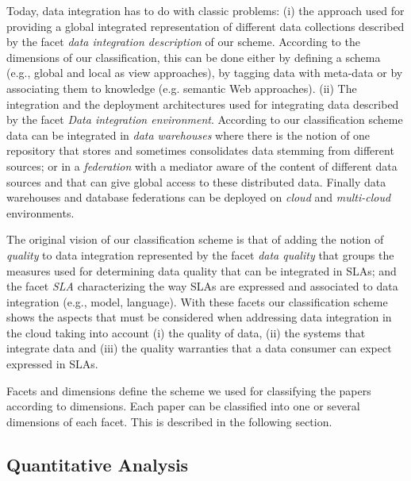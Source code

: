 Today, data integration has to do with  classic problems: (i) the approach used for providing a global integrated representation of different data collections described by the facet {\em data integration description} of our scheme. According to the dimensions of our classification, this can be done either by defining a schema (e.g., global and local as view approaches), by tagging data with meta-data or by associating them to knowledge (e.g. semantic Web approaches). (ii) The integration and the deployment architectures used for integrating data described by the facet {\em Data integration environment}. According to our classification scheme data can be integrated in {\em data warehouses} where there is the notion of one repository that stores and sometimes consolidates data stemming from different sources; or in a {\em federation} with a mediator aware of the content of different data sources and that can give global access to these distributed data. Finally data warehouses and database federations can be deployed on {\em cloud} and {\em multi-cloud} environments. 

The original vision of our classification scheme is that of adding the notion of {\em quality} to data integration represented by the facet {\em data quality} that groups the measures used for determining data quality that can be  integrated in SLAs; and  the facet {\em SLA}  characterizing the way SLAs are expressed and associated to data integration (e.g., model, language). With these facets our classification scheme shows the aspects that must be considered when addressing data integration in the cloud  taking into account (i) the quality of data, (ii) the systems that integrate data and (iii) the quality warranties that a data consumer can expect expressed in SLAs.

Facets and dimensions define the  scheme we used for  classifying the papers  according to dimensions. 
Each paper can be classified into one or several dimensions of each facet. This is described in the following section.

\subsection{Quantitative Analysis}\label{sec:qanalysis}

